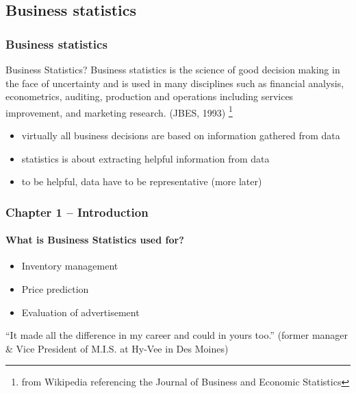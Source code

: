 \documentclass[handout]{beamer}
\begin{document}
\subsection{Business statistics}
\begin{frame}
\frametitle{Business statistics}

\begin{definition}{Business Statistics?}
Business statistics is the science of good decision making in the face of 
uncertainty and is used in many disciplines such as financial analysis, 
econometrics, auditing, production and operations including services 
improvement, and marketing research. 
(JBES, 1993)
\footnote{from Wikipedia referencing the Journal of Business and Economic Statistics}
\end{definition}

\vspace{0.1in} \pause

\begin{itemize}[<+->]
\item virtually all business decisions are based on information gathered from data
\item statistics is about extracting helpful information from data
\item to be helpful, data have to be representative (more later)
\end{itemize}
\end{frame}




\begin{frame}
\frametitle{Chapter 1 -- Introduction}
\framesubtitle{What is Business Statistics used for?}

\begin{itemize}[<+->]
\item Inventory management
\item Price prediction
\item Evaluation of advertisement
\end{itemize}

\vspace{0.1in} \pause


``It made all the difference in my career and could in yours too.'' 
(former manager \& Vice President of M.I.S. at Hy-Vee in Des Moines)

\end{frame}
\end{document}
